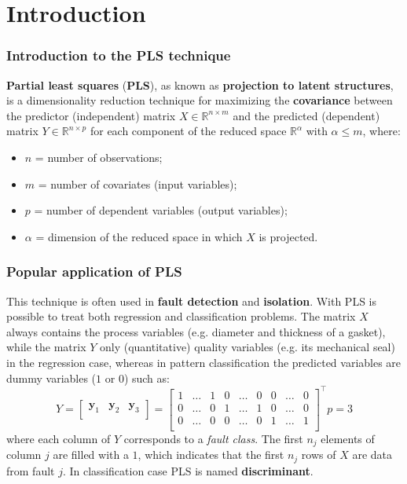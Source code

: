 \section{Introduction}

\begin{frame}
	\frametitle{Introduction to the PLS technique}
	\textbf{Partial least squares} (\textbf{PLS}), as known as \textbf{projection to latent structures}, is a dimensionality reduction technique for maximizing the \textbf{covariance} between the predictor (independent) matrix $X \in \mathbb{R}^{n \times m}$ and the predicted (dependent) matrix $Y \in \mathbb{R}^{n \times p}$ for each component of the reduced space $\mathbb{R}^\alpha$ with $\alpha \le m$, where:
	\begin{itemize}
		\item $n$ = number of observations;
		\item $m$ = number of covariates (input variables);
		\item $p$ = number of dependent variables (output variables);
		\item $\alpha$ = dimension of the reduced space in which $X$ is projected.
	\end{itemize}
\end{frame}

\begin{frame}
	\frametitle{Popular application of PLS}
	This technique is often used in \textbf{fault detection} and \textbf{isolation}. With PLS is possible to treat both regression and classification problems. The matrix $X$ always contains the process variables (e.g. diameter and thickness of a gasket), while the matrix $Y$ only (quantitative) quality variables (e.g. its mechanical seal) in the regression case, whereas in pattern classification the predicted variables are dummy variables ($1$ or $0$) such as:
	\begin{equation*}
		Y = 
		\begin{bmatrix}
			\boldsymbol{y}_1 & \boldsymbol{y}_2 & \boldsymbol{y}_3\\
		\end{bmatrix}
		=
		\begin{bmatrix}
			1 & \dots & 1 & 0 & \dots & 0 & 0 & \dots & 0\\
			0 & \dots & 0 & 1 & \dots & 1 & 0 & \dots & 0\\
			0 & \dots & 0 & 0 & \dots & 0 & 1 & \dots & 1\\
		\end{bmatrix}^\top 
		p = 3
	\end{equation*}
	where each column of $Y$ corresponds to a \textit{fault class}. The first $n_j$ elements of column $j$ are filled with a $1$, which indicates that the first $n_j$ rows of $X$ are data from fault $j$. In classification case PLS is named \textbf{discriminant}.
\end{frame}